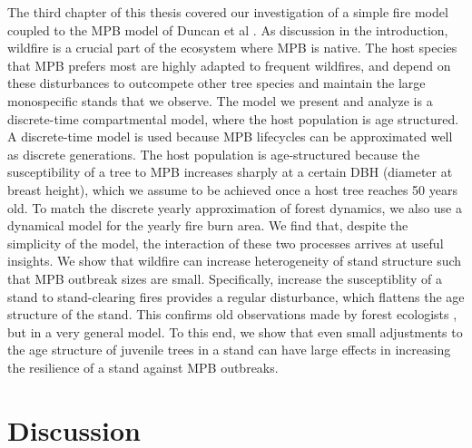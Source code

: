 The third chapter of this thesis covered our investigation of a simple fire model coupled to the MPB model of Duncan et al \cite{duncan2015model}. As discussion in the introduction, wildfire is a crucial part of the ecosystem where MPB is native. The host species that MPB prefers most are highly adapted to frequent wildfires, and depend on these disturbances to outcompete other tree species and maintain the large monospecific stands that we observe. The model we present and analyze is a discrete-time compartmental model, where the host population is age structured. A discrete-time model is used because MPB lifecycles can be approximated well as discrete generations. The host population is age-structured because the susceptibility of a tree to MPB increases sharply at a certain DBH (diameter at breast height), which we assume to be achieved once a host tree reaches 50 years old. To match the discrete yearly approximation of forest dynamics, we also use a dynamical model for the yearly fire burn area. We find that, despite the simplicity of the model, the interaction of these two processes arrives at useful insights. We show that wildfire can increase heterogeneity of stand structure such that MPB outbreak sizes are small. Specifically, increase the susceptiblity of a stand to stand-clearing fires provides a regular disturbance, which flattens the age structure of the stand. This confirms old observations made by forest ecologists \cite{kaufmann2008status, seidl2016spatial}, but in a very general model. To this end, we show that even small adjustments to the age structure of juvenile trees in a stand can have large effects in increasing the resilience of a stand against MPB outbreaks.     


\section{Discussion}

